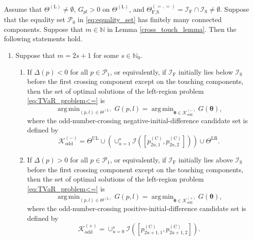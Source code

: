 \documentclass[a4paper,12pt]{article}
\DeclareMathOperator*{\argmin}{arg\,min}
\begin{document}
\begin{proposition}\label{prop:tvar_crossing}
Assume that $\Theta^{\left(\text{L}\right)}\neq\emptyset$, $G_{pl}>0$ on $\Theta^{\left(\text{L}\right)}$, and $\Theta_{\text{F,S}}^{\left(=,=\right)}=\mathcal{I}_{\text{F}}\cap\mathcal{I}_{\text{S}}\neq\emptyset$. Suppose that the equality set $\mathcal{P}_0$ in \eqref{eq:equality_set} has finitely many connected components. Suppose that $m\in\mathbb{N}$ in Lemma \ref{cross_touch_lemma}. Then the following statements hold.

\begin{enumerate}
\item[(i)] Suppose that $m=2s+1$ for some $s\in\mathbb{N}_0$.
\begin{enumerate}
\item[(a)] If $\Delta\left(p\right)<0$ for all $p\in\mathcal{P}_1$, or equivalently, if $\mathcal{I}_{\text{F}}$ initially lies below $\mathcal{I}_{\text{S}}$ before the first crossing component except on the touching components, then the set of optimal solutions of the left-region problem \eqref{eq:TVaR_problem<=} is
\begin{equation*}
\argmin_{\left(p,l\right)\in\Theta^{\left(\text{L}\right)}}G\left(p,l\right)=\argmin_{{\bm\theta}\in\mathcal{K}_{\text{odd}}^{\left(-\right)}}G\left({\bm\theta}\right),
\end{equation*}
where the odd-number-crossing negative-initial-difference candidate set is defined by
\begin{equation*}
\mathcal{K}_{\text{odd}}^{\left(-\right)}=\Theta^{\text{UL}}\cup\left(\cup_{u=1}^{s}\mathcal{I}\left(\left[p^{\left(\text{C}\right)}_{2u,1},p^{\left(\text{C}\right)}_{2u,2}\right]\right)\right)\cup\Theta^{\text{LR}}.
\end{equation*}

\item[(b)] If $\Delta\left(p\right)>0$ for all $p\in\mathcal{P}_1$, or equivalently, if $\mathcal{I}_{\text{F}}$ initially lies above $\mathcal{I}_{\text{S}}$ before the first crossing component except on the touching components, then the set of optimal solutions of the left-region problem \eqref{eq:TVaR_problem<=} is
\begin{equation*}
\argmin_{\left(p,l\right)\in\Theta^{\left(\text{L}\right)}}G\left(p,l\right)=\argmin_{{\bm\theta}\in\mathcal{K}_{\text{odd}}^{\left(+\right)}}G\left({\bm\theta}\right),
\end{equation*}
where the odd-number-crossing positive-initial-difference candidate set is defined by
\begin{equation*}
\mathcal{K}_{\text{odd}}^{\left(+\right)}=\cup_{u=0}^{s}\mathcal{I}\left(\left[p^{\left(\text{C}\right)}_{2u+1,1},p^{\left(\text{C}\right)}_{2u+1,2}\right]\right).
\end{equation*}
\end{enumerate}


\end{enumerate}
\end{proposition}
\end{document}
